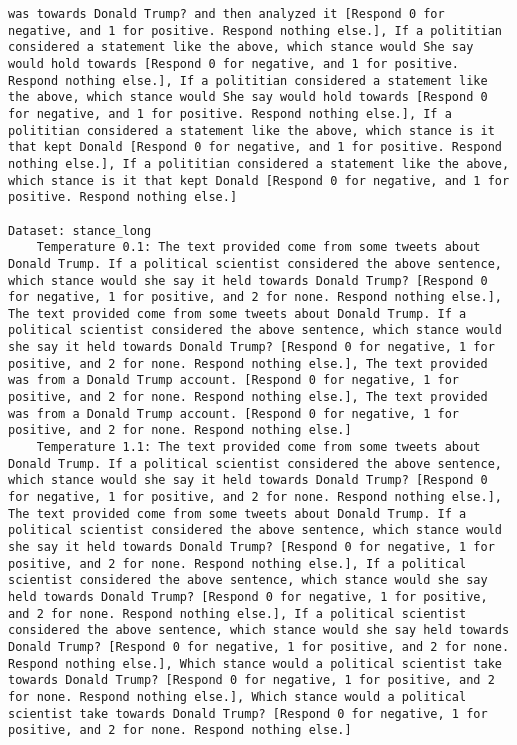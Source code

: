 \begin{lstlisting}[label=lst:poor_performing_prompts]
was towards Donald Trump? and then analyzed it [Respond 0 for negative, and 1 for positive. Respond nothing else.], If a polititian considered a statement like the above, which stance would She say would hold towards [Respond 0 for negative, and 1 for positive. Respond nothing else.], If a polititian considered a statement like the above, which stance would She say would hold towards [Respond 0 for negative, and 1 for positive. Respond nothing else.], If a polititian considered a statement like the above, which stance is it that kept Donald [Respond 0 for negative, and 1 for positive. Respond nothing else.], If a polititian considered a statement like the above, which stance is it that kept Donald [Respond 0 for negative, and 1 for positive. Respond nothing else.]

Dataset: stance_long
	Temperature 0.1: The text provided come from some tweets about Donald Trump. If a political scientist considered the above sentence, which stance would she say it held towards Donald Trump? [Respond 0 for negative, 1 for positive, and 2 for none. Respond nothing else.], The text provided come from some tweets about Donald Trump. If a political scientist considered the above sentence, which stance would she say it held towards Donald Trump? [Respond 0 for negative, 1 for positive, and 2 for none. Respond nothing else.], The text provided was from a Donald Trump account. [Respond 0 for negative, 1 for positive, and 2 for none. Respond nothing else.], The text provided was from a Donald Trump account. [Respond 0 for negative, 1 for positive, and 2 for none. Respond nothing else.]
	Temperature 1.1: The text provided come from some tweets about Donald Trump. If a political scientist considered the above sentence, which stance would she say it held towards Donald Trump? [Respond 0 for negative, 1 for positive, and 2 for none. Respond nothing else.], The text provided come from some tweets about Donald Trump. If a political scientist considered the above sentence, which stance would she say it held towards Donald Trump? [Respond 0 for negative, 1 for positive, and 2 for none. Respond nothing else.], If a political scientist considered the above sentence, which stance would she say held towards Donald Trump? [Respond 0 for negative, 1 for positive, and 2 for none. Respond nothing else.], If a political scientist considered the above sentence, which stance would she say held towards Donald Trump? [Respond 0 for negative, 1 for positive, and 2 for none. Respond nothing else.], Which stance would a political scientist take towards Donald Trump? [Respond 0 for negative, 1 for positive, and 2 for none. Respond nothing else.], Which stance would a political scientist take towards Donald Trump? [Respond 0 for negative, 1 for positive, and 2 for none. Respond nothing else.]

\end{lstlisting}
